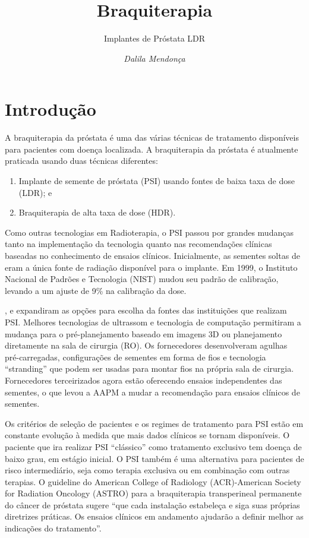 \documentclass[11pt,a4paper]{article}
\title{\LobsterTwo\Huge{Braquiterapia}}
\author{\LobsterTwo\Large{Implantes de Próstata LDR}\nocite{*}}
\date{\LobsterTwo\textit{Dalila Mendonça}}
\begin{document}
	\maketitle

\section{Introdução}

	A braquiterapia da próstata é uma das várias técnicas de tratamento disponíveis para pacientes com doença localizada. A braquiterapia da próstata é atualmente praticada usando duas técnicas diferentes:

	\begin{enumerate}[label=\textcolor{CarnationPink}{\roman*.}]
		\item Implante de semente de próstata (PSI) usando fontes de baixa taxa de dose (LDR); e
		\item Braquiterapia de alta taxa de dose (HDR).
	\end{enumerate}

	Como outras tecnologias em Radioterapia, o PSI passou por grandes mudanças tanto na implementação da tecnologia quanto nas recomendações clínicas baseadas no conhecimento de ensaios clínicos. Inicialmente, as sementes soltas de  eram a única fonte de radiação disponível para o implante. Em 1999, o Instituto Nacional de Padrões e Tecnologia (NIST) mudou seu padrão de calibração, levando a um ajuste de 9\% na calibração da dose. 
	
	,  e  expandiram as opções para escolha da fontes das instituições que realizam PSI. Melhores tecnologias de ultrassom e tecnologia de computação permitiram a mudança para o pré-planejamento baseado em imagens 3D ou planejamento diretamente na sala de cirurgia (RO). Os fornecedores desenvolveram agulhas pré-carregadas, configurações de sementes em forma de fios e tecnologia  ``stranding'' que podem ser usadas para montar fios na própria sala de cirurgia. Fornecedores terceirizados agora estão oferecendo ensaios independentes das sementes, o que levou a AAPM a mudar a recomendação para ensaios clínicos de sementes.

	Os critérios de seleção de pacientes e os regimes de tratamento para PSI estão em constante evolução à medida que mais dados clínicos se tornam disponíveis. O paciente que ira realizar PSI ``clássico'' como tratamento exclusivo tem doença de baixo grau, em estágio inicial. O PSI também é uma alternativa para pacientes de risco intermediário, seja como terapia exclusiva ou em combinação com outras terapias. O guideline do American College of Radiology (ACR)-American Society for Radiation Oncology (ASTRO) para a braquiterapia transperineal permanente do câncer de próstata sugere “que cada instalação estabeleça e siga suas próprias diretrizes práticas. Os ensaios clínicos em andamento ajudarão a definir melhor as indicações do tratamento”. 
\end{document}
